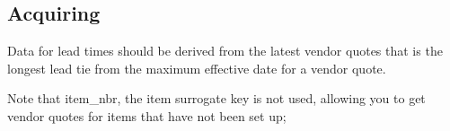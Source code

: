 \documentclass[letterpaper,10pt,english]{sphinxmanual}
\begin{document}
\subsection{Acquiring}
\label{\detokenize{400-MultipleLeadTimes:acquiring}}
Data for lead times should be derived from the latest vendor quotes that is the longest lead tie from
the maximum effective date for a vendor quote.

Note that item\_nbr, the item surrogate key is not used, allowing you to
get vendor quotes for items that have not been set up;

\begin{sphinxVerbatim}[commandchars=\\\{\}]
   
  
     
         
 
  
\end{sphinxVerbatim}
\end{document}

